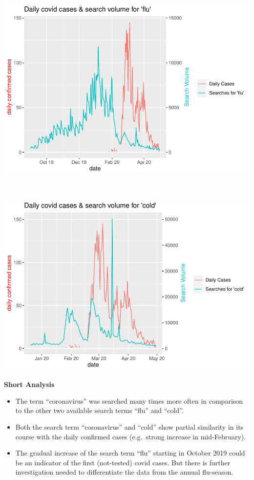 \documentclass[
]{article}
\providecommand{\tightlist}{%
  \setlength{\itemsep}{0pt}\setlength{\parskip}{0pt}}
\begin{document}
~

\includegraphics{Main_Analysis_files/figure-latex/unnamed-chunk-6-1.pdf}

~

\includegraphics{Main_Analysis_files/figure-latex/unnamed-chunk-7-1.pdf}

\textbf{Short Analysis}

\begin{itemize}
\tightlist
\item
  The term ``coronavirus'' was searched many times more often in
  comparison to the other two available search terms ``flu'' and
  ``cold''.
\item
  Both the search term ``coronavirus'' and ``cold'' show partial
  similarity in its course with the daily confirmed cases (e.g.~strong
  increase in mid-February).
\item
  The gradual increase of the search term ``flu'' starting in October
  2019 could be an indicator of the first (not-tested) covid cases. But
  there is further investigation needed to differentiate the data from
  the annual flu-season.
\end{itemize}
\end{document}
